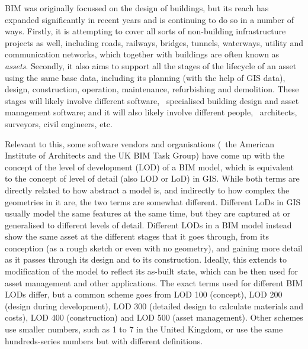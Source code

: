 BIM was originally focussed on the design of buildings, but its reach has expanded significantly in recent years and is continuing to do so in a number of ways.
Firstly, it is attempting to cover all sorts of non-building infrastructure projects as well, including roads, railways, bridges, tunnels, waterways, utility and communication networks, which together with buildings are often known as \emph{assets}.
Secondly, it also aims to support all the stages of the lifecycle of an asset using the same base data, including its planning (with the help of GIS data), design, construction, operation, maintenance, refurbishing and demolition.
These stages will likely involve different software, \eg\ specialised building design and asset management software; and it will also likely involve different people, \eg\ architects, surveyors, civil engineers, etc.

Relevant to this, some software vendors and organisations (\eg\ the American Institute of Architects and the UK BIM Task Group) have come up with the concept of the level of development (LOD) of a BIM model, which is equivalent to the concept of level of detail (also LOD or LoD) in GIS\@.
While both terms are directly related to how abstract a model is, and indirectly to how complex the geometries in it are, the two terms are somewhat different.
Different LoDs in GIS usually model the same features at the same time, but they are captured at or generalised to different levels of detail.
Different LODs in a BIM model instead show the same asset at the different stages that it goes through, from its conception (as a rough sketch or even with no geometry), and gaining more detail as it passes through its design and to its construction.
Ideally, this extends to modification of the model to reflect its as-built state, which can be then used for asset management and other applications.
The exact terms used for different BIM LODs differ, but a common scheme goes from LOD 100 (concept), LOD 200 (design during development), LOD 300 (detailed design to calculate materials and costs), LOD 400 (construction) and LOD 500 (asset management).
Other schemes use smaller numbers, such as 1 to 7 in the United Kingdom, or use the same hundreds-series numbers but with different definitions.

